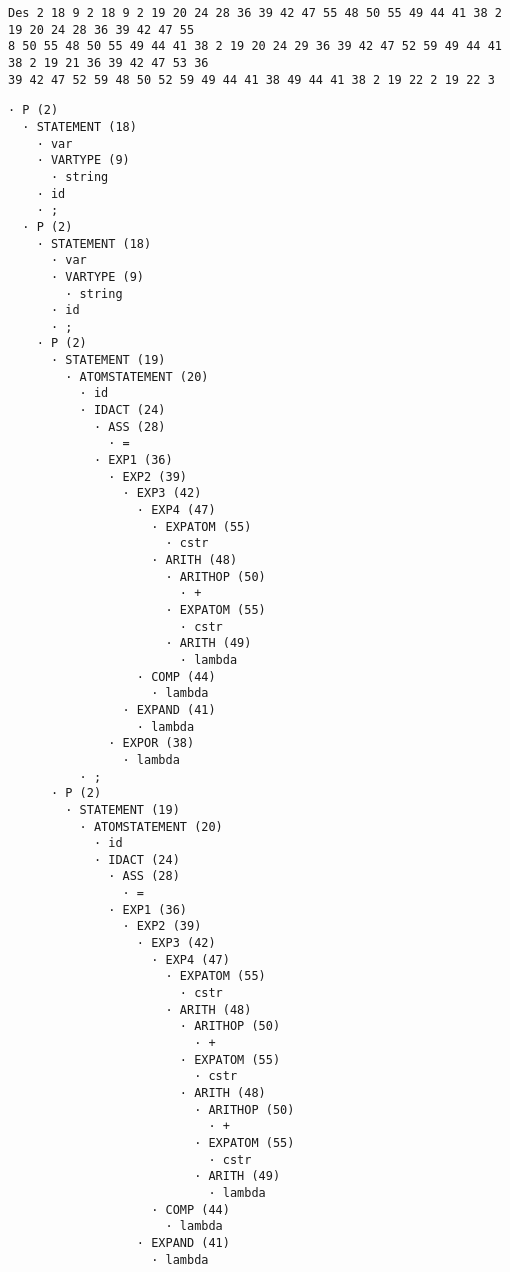 \begin{enumerate}
    \begin{tcolorbox}[title={Volcado del parse}, colback=white]
        \begin{lstlisting}
Des 2 18 9 2 18 9 2 19 20 24 28 36 39 42 47 55 48 50 55 49 44 41 38 2 19 20 24 28 36 39 42 47 55
8 50 55 48 50 55 49 44 41 38 2 19 20 24 29 36 39 42 47 52 59 49 44 41 38 2 19 21 36 39 42 47 53 36
39 42 47 52 59 48 50 52 59 49 44 41 38 49 44 41 38 2 19 22 2 19 22 3
        \end{lstlisting}
    \end{tcolorbox}

    \begin{tcolorbox}[title={Árbol sintáctico}, colback=white, breakable]
        \begin{lstlisting}
· P (2)
  · STATEMENT (18)
    · var
    · VARTYPE (9)
      · string
    · id
    · ;
  · P (2)
    · STATEMENT (18)
      · var
      · VARTYPE (9)
        · string
      · id
      · ;
    · P (2)
      · STATEMENT (19)
        · ATOMSTATEMENT (20)
          · id
          · IDACT (24)
            · ASS (28)
              · =
            · EXP1 (36)
              · EXP2 (39)
                · EXP3 (42)
                  · EXP4 (47)
                    · EXPATOM (55)
                      · cstr
                    · ARITH (48)
                      · ARITHOP (50)
                        · +
                      · EXPATOM (55)
                        · cstr
                      · ARITH (49)
                        · lambda
                  · COMP (44)
                    · lambda
                · EXPAND (41)
                  · lambda
              · EXPOR (38)
                · lambda
          · ;
      · P (2)
        · STATEMENT (19)
          · ATOMSTATEMENT (20)
            · id
            · IDACT (24)
              · ASS (28)
                · =
              · EXP1 (36)
                · EXP2 (39)
                  · EXP3 (42)
                    · EXP4 (47)
                      · EXPATOM (55)
                        · cstr
                      · ARITH (48)
                        · ARITHOP (50)
                          · +
                        · EXPATOM (55)
                          · cstr
                        · ARITH (48)
                          · ARITHOP (50)
                            · +
                          · EXPATOM (55)
                            · cstr
                          · ARITH (49)
                            · lambda
                    · COMP (44)
                      · lambda
                  · EXPAND (41)
                    · lambda

\end{lstlisting}
\end{tcolorbox}
\end{enumerate}
